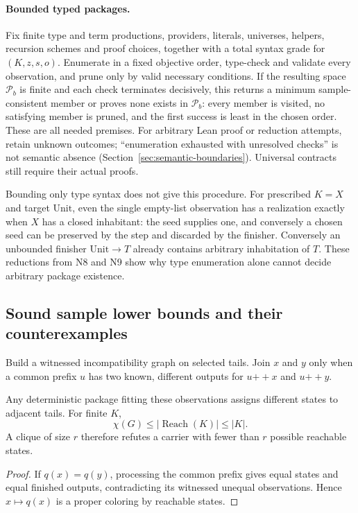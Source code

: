 \paragraph{Bounded typed packages.}
Fix finite type and term productions, providers, literals, universes, helpers,
recursion schemes and proof choices, together with a total syntax grade for
$(K,z,s,o)$. Enumerate in a fixed objective order, type-check and validate every
observation, and prune only by valid necessary conditions. If the resulting
space $\mathcal P_b$ is finite and each check terminates decisively, this
returns a minimum sample-consistent member or proves none exists in
$\mathcal P_b$: every member is visited, no satisfying member is pruned, and
the first success is least in the chosen order. These are all needed premises.
For arbitrary Lean proof or reduction attempts, retain unknown outcomes;
``enumeration exhausted with unresolved checks'' is not semantic absence
(Section~\ref{sec:semantic-boundaries}). Universal contracts still require
their actual proofs.

Bounding only type syntax does not give this procedure. For prescribed
$K=X$ and target $\mathrm{Unit}$, even the single empty-list observation has
a realization exactly when $X$ has a closed inhabitant: the seed supplies one,
and conversely a chosen seed can be preserved by the step and discarded by
the finisher. Conversely an unbounded finisher $\mathrm{Unit}\to T$ already
contains arbitrary inhabitation of $T$. These reductions from N8 and N9 show
why type enumeration alone cannot decide arbitrary package existence.

\subsection{Sound sample lower bounds and their counterexamples}
\label{sec:carrier-lower-bounds}

Build a witnessed incompatibility graph on selected tails. Join $x$ and $y$
only when a common prefix $u$ has two known, different outputs for
$u\mathbin{+\!+}x$ and $u\mathbin{+\!+}y$.

\begin{proposition}
\label{prop:carrier-capacity}
Any deterministic package fitting these observations assigns different states
to adjacent tails. For finite $K$,
\[
 \chi(G)\le |\operatorname{Reach}(K)|\le |K|.
\]
A clique of size $r$ therefore refutes a carrier with fewer than $r$ possible
reachable states.
\end{proposition}
\begin{proof}
If $q(x)=q(y)$, processing the common prefix gives equal states and equal
finished outputs, contradicting its witnessed unequal observations. Hence
$x\mapsto q(x)$ is a proper coloring by reachable states.
\end{proof}


